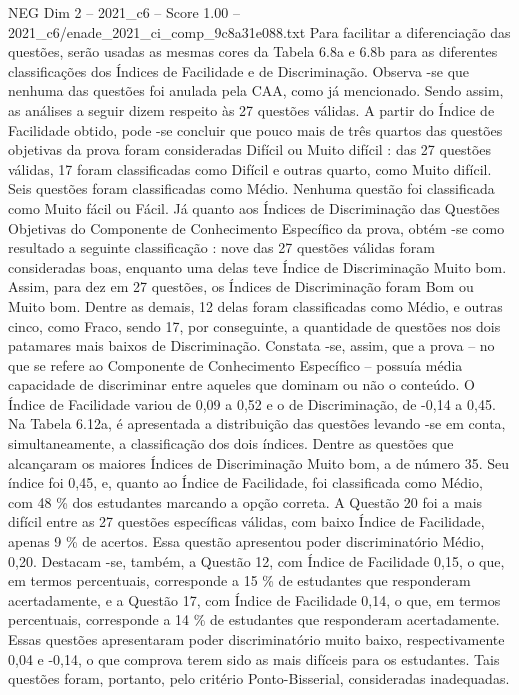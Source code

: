 \begin{textsample}{NEG Dim 2 – 2021\_c6 – Score 1.00 – 2021\_c6/enade\_2021\_ci\_comp\_9c8a31e088.txt}
Para facilitar a diferenciação das questões, serão usadas as mesmas cores da Tabela 6.8a e 6.8b para as diferentes classificações dos Índices de Facilidade e de Discriminação.
Observa -se que nenhuma das questões foi anulada pela CAA, como já mencionado.
Sendo assim, as análises a seguir dizem respeito às 27 questões válidas.
A partir do Índice de Facilidade obtido, pode -se concluir que pouco mais de três quartos das questões objetivas da prova foram consideradas Difícil ou Muito difícil : das 27 questões válidas, 17 foram classificadas como Difícil e outras quarto, como Muito difícil.
Seis questões foram classificadas como Médio.
Nenhuma questão foi classificada como Muito fácil ou Fácil.
Já quanto aos Índices de Discriminação das Questões Objetivas do Componente de Conhecimento Específico da prova, obtém -se como resultado a seguinte classificação : nove das 27 questões válidas foram consideradas boas, enquanto uma delas teve Índice de Discriminação Muito bom.
Assim, para dez em 27 questões, os Índices de Discriminação foram Bom ou Muito bom.
Dentre as demais, 12 delas foram classificadas como Médio, e outras cinco, como Fraco, sendo 17, por conseguinte, a quantidade de questões nos dois patamares mais baixos de Discriminação.
Constata -se, assim, que a prova – no que se refere ao Componente de Conhecimento Específico – possuía média capacidade de discriminar entre aqueles que dominam ou não o conteúdo.
O Índice de Facilidade variou de 0,09 a 0,52 e o de Discriminação, de -0,14 a 0,45.
Na Tabela 6.12a, é apresentada a distribuição das questões levando -se em conta, simultaneamente, a classificação dos dois índices.
Dentre as questões que alcançaram os maiores Índices de Discriminação Muito bom, a de número 35.
Seu índice foi 0,45, e, quanto ao Índice de Facilidade, foi classificada como Médio, com 48 \% dos estudantes marcando a opção correta.
A Questão 20 foi a mais difícil entre as 27 questões específicas válidas, com baixo Índice de Facilidade, apenas 9 \% de acertos.
Essa questão apresentou poder discriminatório Médio, 0,20.
Destacam -se, também, a Questão 12, com Índice de Facilidade 0,15, o que, em termos percentuais, corresponde a 15 \% de estudantes que responderam acertadamente, e a Questão 17, com Índice de Facilidade 0,14, o que, em termos percentuais, corresponde a 14 \% de estudantes que responderam acertadamente.
Essas questões apresentaram poder discriminatório muito baixo, respectivamente 0,04 e -0,14, o que comprova terem sido as mais difíceis para os estudantes.
Tais questões foram, portanto, pelo critério Ponto-Bisserial, consideradas inadequadas.

\end{textsample}
